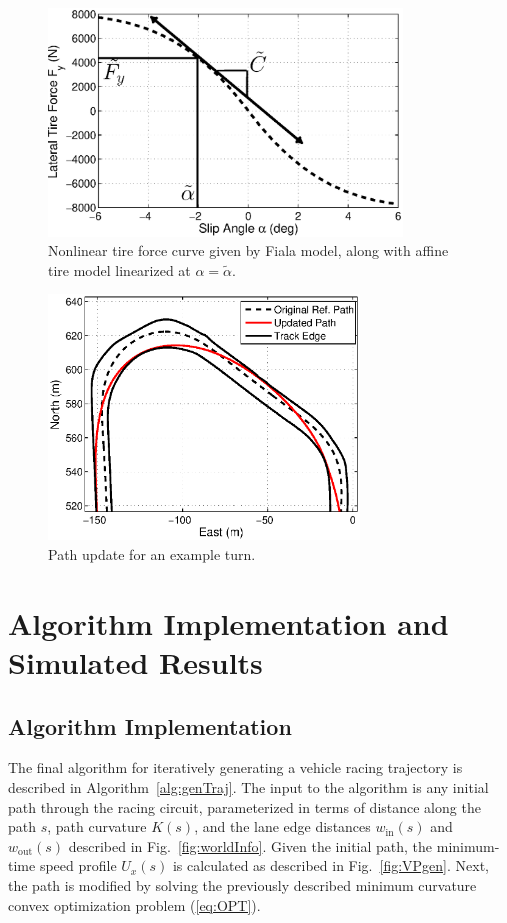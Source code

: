 \documentclass[twocolumn,10pt]{asme2ej}
\begin{document}
  \begin{figure}
\centering
\includegraphics[width=3.7in]{figures/fiala.eps}
\caption{Nonlinear tire force curve given by Fiala model, along with affine tire model linearized at $\alpha = \tilde{\alpha}$. }
\label{fig:fiala}
\end{figure}

\begin{figure}
\centering
\includegraphics[width=3.25in]{figures/updatedpath.eps}
\caption{Path update for an example turn.}
\label{fig:hairpin}
\end{figure}
 
\section{Algorithm Implementation and Simulated Results}
\label{sec:IMPLEMENT}
\subsection{Algorithm Implementation}
The final algorithm for iteratively
generating a vehicle racing trajectory is described in Algorithm~\ref{alg:genTraj}. The input to the algorithm is any initial path through the racing circuit, 
parameterized in terms of distance along the path $s$, path curvature $K(s)$, and the lane edge distances $w_\mathrm{in}(s)$ and 
$w_\mathrm{out}(s)$ described in Fig.~\ref{fig:worldInfo}. Given the initial path, the minimum-time speed profile $U_x(s)$ is calculated as described in 
Fig.~\ref{fig:VPgen}. Next, the path is modified by solving the previously described minimum curvature
 convex optimization problem (\ref{eq:OPT}). 
 
\end{document}
